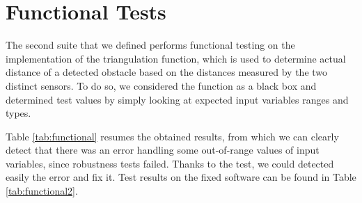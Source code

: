 \section{Functional Tests}

The second suite that we defined performs functional testing on the implementation of the triangulation function, which is used to determine actual distance of a detected obstacle based on the distances measured by the two distinct sensors. To do so, we considered the function as a black box and determined test values by simply looking at expected input variables ranges and types.

Table \ref{tab:functional} resumes the obtained results, from which we can clearly detect that there was an error handling some out-of-range values of input variables, since robustness tests failed. Thanks to the test, we could detected easily the error and fix it. Test results on the fixed software can be found in Table \ref{tab:functional2}.


